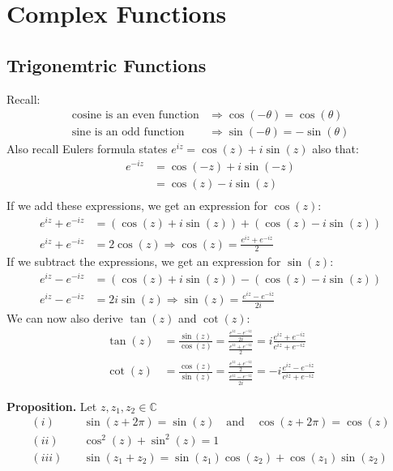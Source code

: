 \documentclass[a4paper, 10pt]{article}
\begin{document}
\pagebreak

\section{Complex Functions}
\subsection{Trigonemtric Functions}
Recall:
\begin{align*}
  \text{cosine is an even function} & \Rightarrow \cos(-\theta) = \cos(\theta)  \\
  \text{sine is an odd function}    & \Rightarrow \sin(-\theta) = -\sin(\theta)
\end{align*}
Also recall Eulers formula states $e^{iz} = \cos(z) + i\sin(z) $ also that:
\begin{align*}
  e^{-iz} & = \cos(-z) + i\sin(-z) \\
          & = \cos(z) - i\sin(z)   \\
\end{align*}
If we  add these expressions, we get an expression for $\cos(z)$:
\begin{align*}
  e^{iz} + e^{-iz} & = (\cos(z) + i\sin(z)) + (\cos(z) - i \sin(z))              \\
  e^{iz} + e^{-iz} & = 2\cos(z) \Rightarrow \cos(z) = \frac{e^{iz} + e^{-iz}}{2}
\end{align*}
If we subtract the expressions, we get an expression for $\sin(z)$:
\begin{align*}
  e^{iz} - e^{-iz} & = (\cos(z) + i\sin(z)) - (\cos(z) - i \sin(z))                \\
  e^{iz} - e^{-iz} & = 2i\sin(z) \Rightarrow \sin(z) = \frac{e^{iz} - e^{-iz}}{2i}
\end{align*}
We can now also derive $\tan(z)$ and $\cot(z)$:
\begin{align*}
  \tan(z) & = \frac{\sin(z)}{\cos(z)} = \frac{\frac{e^{iz} - e^{-iz}}{2i}}{ \frac{e^{iz} + e^{-iz}}{2}} = i \frac{e^{iz} + e^{-iz}}{e^{iz} + e^{-iz}} \\
  \cot(z) & = \frac{\cos(z)}{\sin(z)} = \frac{\frac{e^{iz} + e^{-iz}}{2}}{\frac{e^{iz} - e^{-iz}}{2i}} = -i \frac{e^{iz} - e^{-iz}}{e^{iz} + e^{-iz}}
\end{align*}

\noindent\textbf{Proposition.} Let $z, z_1, z_2 \in \mathbb{C}$
\begin{align*}
  (i)   & \quad \sin(z + 2\pi) = \sin(z)  \quad \text{and} \quad \cos(z + 2\pi) = \cos(z) \\
  (ii)  & \quad \cos^2(z) + \sin^2(z) = 1                                                 \\
  (iii) & \quad \sin(z_1 + z_2) = \sin(z_1)\cos(z_2) + \cos(z_1)\sin(z_2)                 \\
\end{align*}
\end{document}

